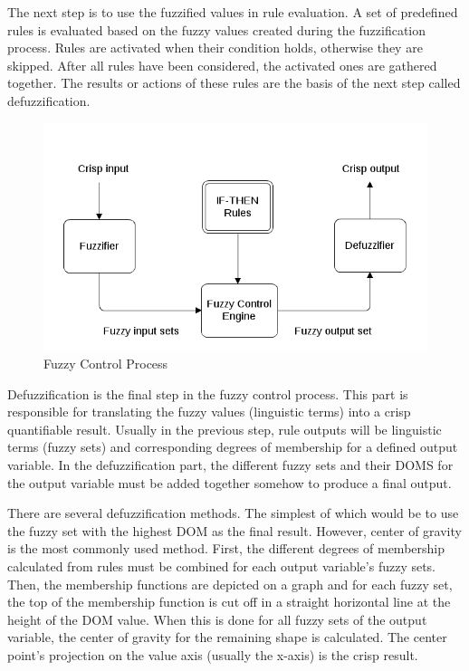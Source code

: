 The next step is to use the fuzzified values in rule evaluation. A set of predefined rules is evaluated based on the fuzzy values created during the fuzzification process. Rules are activated when their condition holds, otherwise they are skipped. After all rules have been considered, the activated ones are gathered together. The results or actions of these rules are the basis of the next step called defuzzification.

\begin{figure}[h]
\centering
\includegraphics[scale=0.6]{2/figures/fuzzy_control_engine.png}
\caption{Fuzzy Control Process \cite{fuzzy_logic_offloading}}
\label{fuzzy_control_process}
\end{figure}

Defuzzification is the final step in the fuzzy control process. This part is responsible for translating the fuzzy values (linguistic terms) into a crisp quantifiable result. Usually in the previous step, rule outputs will be linguistic terms (fuzzy sets) and corresponding degrees of membership for a defined output variable. In the defuzzification part, the different fuzzy sets and their DOMS for the output variable must be added together somehow to produce a final output. 

There are several defuzzification methods. The simplest of which would be to use the fuzzy set with the highest DOM as the final result. However, center of gravity is the most commonly used method. First, the different degrees of membership calculated from rules must be combined for each output variable's fuzzy sets. Then, the membership functions are depicted on a graph and for each fuzzy set, the top of the membership function is cut off in a straight horizontal line at the height of the DOM value. When this is done for all fuzzy sets of the output variable, the center of gravity for the remaining shape is calculated. The center point's projection on the value axis (usually the x-axis) is the crisp result.


